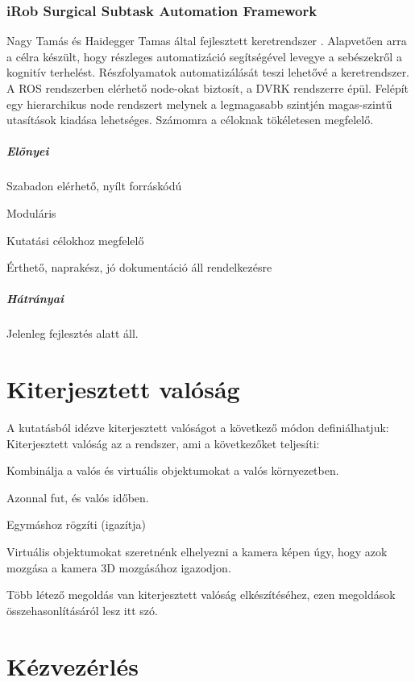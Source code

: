 \documentclass[12pt,a4paper,oneside]{report} %
\begin{document}
\subsubsection{iRob Surgical
Subtask Automation Framework}
\label{irob}
Nagy Tamás és Haidegger Tamas által fejlesztett keretrendszer  \cite{irobsaf2019}.
Alapvetően arra a célra készült, hogy részleges automatizáció segítségével levegye a sebészekről a kognitív terhelést. Részfolyamatok automatizálását teszi lehetővé a keretrendszer. A ROS rendszerben elérhető node-okat biztosít, a DVRK rendszerre épül. Felépít egy hierarchikus node rendszert melynek a legmagasabb szintjén magas-szintű utasítások kiadása lehetséges. Számomra a céloknak tökéletesen megfelelő.
\subparagraph{Előnyei} 
\begin{compactitem}
	\item Szabadon elérhető, nyílt forráskódú
	\item Moduláris
	\item Kutatási célokhoz megfelelő
	\item Érthető, naprakész, jó dokumentáció áll rendelkezésre
\end{compactitem}
\subparagraph{Hátrányai} 
\begin{compactitem}
	\item Jelenleg fejlesztés alatt áll.
\end{compactitem}


\section{Kiterjesztett valóság}
\label{kitvalo}
A \cite{azuma2001recent} kutatásból idézve  kiterjesztett valóságot a következő módon definiálhatjuk: Kiterjesztett valóság az a rendszer, ami a következőket teljesíti:
\begin{compactitem}
	\item Kombinálja a valós és virtuális objektumokat a valós környezetben.
	\item Azonnal fut, és valós időben.
	\item Egymáshoz rögzíti (igazítja) %
\end{compactitem}
Virtuális objektumokat szeretnénk elhelyezni a kamera képen úgy, hogy azok mozgása a kamera 3D mozgásához igazodjon. 
 \par Több létező megoldás van kiterjesztett valóság elkészítéséhez, ezen megoldások összehasonlításáról lesz itt szó.

\section{Kézvezérlés}
\label{kezvez}
\end{document}
